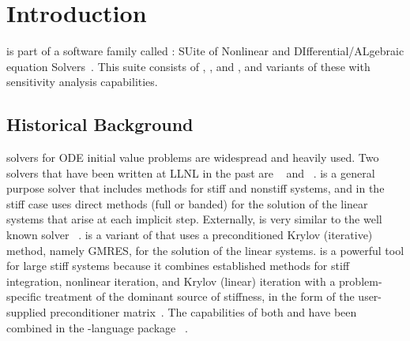 \chapter{Introduction}\label{s:intro}

{\cvode} is part of a software family called {\sundials}: 
SUite of Nonlinear and DIfferential/ALgebraic equation Solvers~\cite{HBGLSSW:05}.  
This suite consists of {\cvode}, {\kinsol}, and {\ida}, and variants of these
with sensitivity analysis capabilities.
%
\section{Historical Background}\label{ss:history}

{\F} solvers for ODE initial value problems are widespread and heavily used. 
Two solvers that have been written at LLNL in the past are {\vode}~\cite{BBH:89} 
and {\vodpk}~\cite{Byr:92}.
{\vode} is a general purpose solver that includes methods for
stiff and nonstiff systems, and in the stiff case uses direct methods (full or
banded) for the solution of the linear systems that arise at each implicit
step. Externally, {\vode} is very similar to the well known solver
{\lsode}~\cite{RaHi:94}. {\vodpk}
is a variant of {\vode} that uses a preconditioned Krylov (iterative)
method, namely GMRES, for the solution of the linear systems. {\vodpk}
is a powerful tool for large stiff systems because it combines
established methods for stiff integration, nonlinear iteration, and
Krylov (linear) iteration with a problem-specific treatment of the
dominant source of stiffness, in the form of the user-supplied
preconditioner matrix~\cite{BrHi:89}.  The capabilities of both
{\vode} and {\vodpk} have been combined in the {\C}-language package
{\cvode}~\cite{CoHi:96}.

